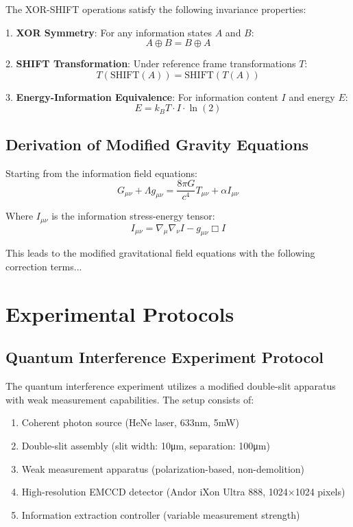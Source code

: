 \documentclass[12pt,letterpaper]{article}
\newcommand{\xor}{\oplus}
\newcommand{\shift}{\text{SHIFT}}
\begin{document}
The XOR-SHIFT operations satisfy the following invariance properties:

1. \textbf{XOR Symmetry}: For any information states $A$ and $B$:
\begin{equation}
A \xor B = B \xor A
\end{equation}

2. \textbf{SHIFT Transformation}: Under reference frame transformations $T$:
\begin{equation}
T(\shift(A)) = \shift(T(A))
\end{equation}

3. \textbf{Energy-Information Equivalence}: For information content $I$ and energy $E$:
\begin{equation}
E = k_B T \cdot I \cdot \ln(2)
\end{equation}

\subsection{Derivation of Modified Gravity Equations}

Starting from the information field equations:
\begin{equation}
G_{\mu\nu} + \Lambda g_{\mu\nu} = \frac{8\pi G}{c^4} T_{\mu\nu} + \alpha I_{\mu\nu}
\end{equation}

Where $I_{\mu\nu}$ is the information stress-energy tensor:
\begin{equation}
I_{\mu\nu} = \nabla_\mu \nabla_\nu I - g_{\mu\nu}\Box I
\end{equation}

This leads to the modified gravitational field equations with the following correction terms...

\section{Experimental Protocols}

\subsection{Quantum Interference Experiment Protocol}

The quantum interference experiment utilizes a modified double-slit apparatus with weak measurement capabilities. The setup consists of:

\begin{enumerate}
\item Coherent photon source (HeNe laser, 633nm, 5mW)
\item Double-slit assembly (slit width: 10μm, separation: 100μm)
\item Weak measurement apparatus (polarization-based, non-demolition)
\item High-resolution EMCCD detector (Andor iXon Ultra 888, 1024×1024 pixels)
\item Information extraction controller (variable measurement strength)
\end{enumerate}
\end{document}
